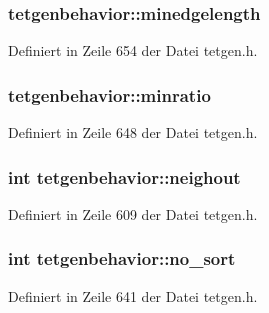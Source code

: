 \hypertarget{classtetgenbehavior_a51d41b9aaa89c0dc620c4af78848dfde}{
\subsubsection[{minedgelength}]{ tetgenbehavior\-::minedgelength}}\label{classtetgenbehavior_a51d41b9aaa89c0dc620c4af78848dfde}


Definiert in Zeile 654 der Datei tetgen.\-h.

\hypertarget{classtetgenbehavior_a1c250b5245602594e5c3e0a61d6ba3bd}{
\subsubsection[{minratio}]{ tetgenbehavior\-::minratio}}\label{classtetgenbehavior_a1c250b5245602594e5c3e0a61d6ba3bd}


Definiert in Zeile 648 der Datei tetgen.\-h.

\hypertarget{classtetgenbehavior_a4a35b0367905194f5c97f8ba1ea45242}{
\subsubsection[{neighout}]{\setlength{\rightskip}{0pt plus 5cm}int tetgenbehavior\-::neighout}}\label{classtetgenbehavior_a4a35b0367905194f5c97f8ba1ea45242}


Definiert in Zeile 609 der Datei tetgen.\-h.

\hypertarget{classtetgenbehavior_aa028ef7527ddb92cf8be45596424dd2f}{
\subsubsection[{no\-\_\-sort}]{\setlength{\rightskip}{0pt plus 5cm}int tetgenbehavior\-::no\-\_\-sort}}\label{classtetgenbehavior_aa028ef7527ddb92cf8be45596424dd2f}


Definiert in Zeile 641 der Datei tetgen.\-h.

